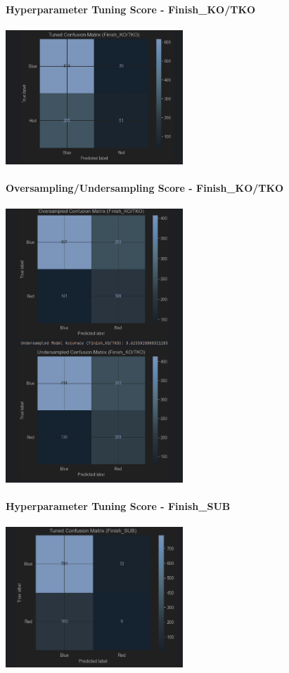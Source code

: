 \documentclass{article}
\begin{document}
	{\large \textbf{Hyperparameter Tuning Score - Finish\_KO/TKO}}\\\\
	\includegraphics[width=0.5\textwidth]{images/CM_Hyp_KO-TKO.png}\\\\
	{\large \textbf{Oversampling/Undersampling Score - Finish\_KO/TKO}}\\\\
	\includegraphics[width=0.5\textwidth]{images/CM_U_O_KO-TKO.png}\\\\
	\newpage
	{\large \textbf{Hyperparameter Tuning Score - Finish\_SUB}}\\\\
	\includegraphics[width=0.5\textwidth]{images/CM_Hyp_SUB.png}\\\\
\end{document}
